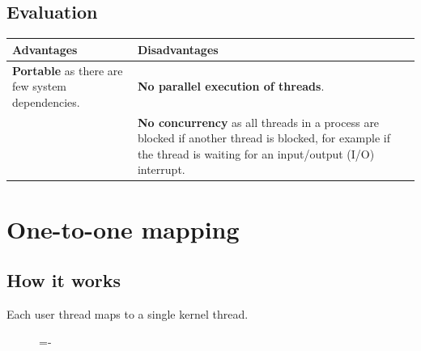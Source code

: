 \documentclass[a4paper]{systems-software}
\begin{document}
\subsection*{Evaluation}

\begin{longtabu} to \textwidth {|X[1,l]|X[1,l]|}
    \hline
    \textbf{Advantages} & \textbf{Disadvantages}
    \\ \hline
    \textbf{Portable} as there are few system dependencies.
    &
    \textbf{No parallel execution of threads}.
    \\ \hline
    &
    \textbf{No concurrency} as all threads in a process are blocked if another thread is blocked, for example if the thread is waiting for an input/output (I/O) interrupt.
	\\ \hline
\end{longtabu}


\section*{One-to-one mapping}

\subsection*{How it works}

Each user thread maps to a single kernel thread.

\begin{figure}[H]
  \lineskip=-\fboxrule
\end{figure}
\end{document}
